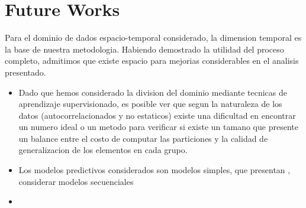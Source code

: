 \section{Future Works}

Para el dominio de dados espacio-temporal considerado, la dimension temporal es la base de nuestra metodologia. Habiendo demostrado la utilidad del proceso completo, admitimos que existe espacio para mejorias considerables en el analisis presentado. 
\begin{itemize}
	\item Dado que hemos considerado la division del dominio mediante tecnicas de aprendizaje supervisionado, es posible ver que segun la naturaleza de los datos (autocorrelacionados y no estaticos) existe una dificultad en encontrar un numero ideal o un metodo para verificar si existe un tamano que presente un balance entre el costo de computar las particiones y la calidad de generalizacion de los elementos en cada grupo. 
	
	\item Los modelos predictivos considerados son modelos simples, que presentan , considerar modelos secuenciales 
	
	\item 
\end{itemize}